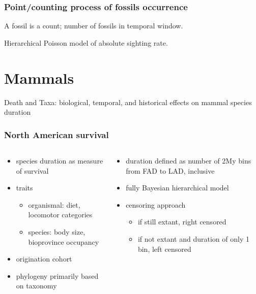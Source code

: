 \documentclass{beamer}
\begin{document}
\begin{frame}
  \frametitle{Point/counting process of fossils occurrence}

  A fossil is a count; number of fossils in temporal window.

  Hierarchical Poisson model of absolute sighting rate.

\end{frame}


\section{Mammals}
\begin{frame}
  Death and Taxa: biological, temporal, and historical effects on mammal species duration
\end{frame}

\begin{frame}
  \frametitle{North American survival}
  \begin{columns}
    \begin{column}{0.5\textwidth}
      \begin{itemize}
        \item species duration as measure of survival
        \item traits
          \begin{itemize}
            \item organismal: diet, locomotor categories
            \item species: body size, bioprovince occupancy
          \end{itemize}
        \item origination cohort
        \item phylogeny primarily based on taxonomy
      \end{itemize}
    \end{column}
    \begin{column}{0.5\textwidth}
      \begin{itemize}
        \item duration defined as number of 2My bins from FAD to LAD, inclusive
        \item fully Bayesian hierarchical model
        \item censoring approach
          \begin{itemize}
            \item if still extant, right censored
            \item if not extant and duration of only 1 bin, left censored
          \end{itemize}
      \end{itemize}
    \end{column}
  \end{columns}
\end{frame}
\end{document}
